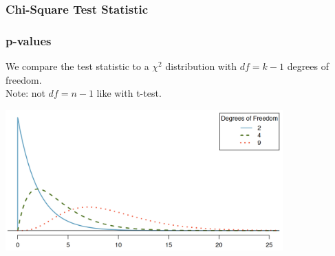 \documentclass[handout]{beamer}
\newcommand{\blue}[1]{\textcolor{blue2}{#1}}
\begin{document}
\begin{frame}[fragile]
\frametitle{Chi-Square Test Statistic}
%
%
%
%
%
\end{frame}


\begin{frame}[fragile]
\frametitle{p-values}
We compare the test statistic to a $\chi^2$ distribution with $df=k-1$ degrees of freedom.\\  Note: not $df=n-1$ like with t-test.  

\vspace{0.25cm}

\begin{center}
\includegraphics[width=0.8\textwidth]{figure/chi.png}
\end{center}

\end{frame}
\end{document}
